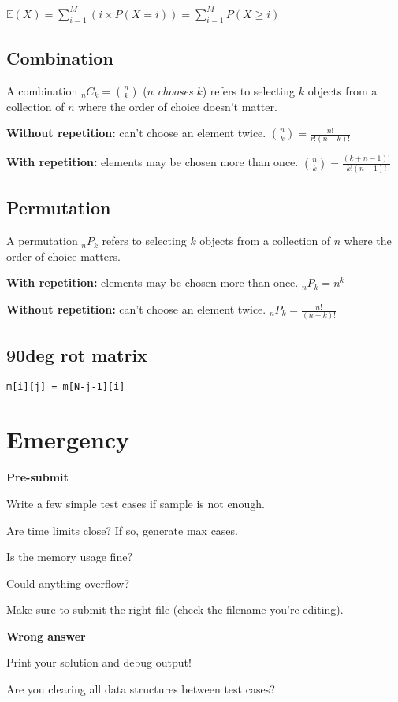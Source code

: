 \documentclass[a4paper]{article}
\begin{document}
$\mathbb{E}(X) = \sum_{i=1}^{M} (i \times P(X=i)) = \sum_{i=1}^{M} P(X \geq i)$

\subsection{Combination}
A combination ${}_nC_k = \binom{n}{k}$ ($n$ \textit{chooses} $k$) refers to selecting $k$ objects from a collection of $n$ where the order of choice doesn't matter.

\textbf{Without repetition:} can't choose an element twice. $\binom{n}{k} = \frac{n!}{r!(n-k)!}$

\textbf{With repetition:} elements may be chosen more than once. $\binom{n}{k} = \frac{(k+n-1)!}{k!(n-1)!}$

\subsection{Permutation}
A permutation ${}_nP_k$ refers to selecting $k$ objects from a collection of $n$ where the order of choice matters.

\textbf{With repetition:} elements may be chosen more than once. ${}_nP_k = n^k$

\textbf{Without repetition:} can't choose an element twice. ${}_nP_k = \frac{n!}{(n-k)!}$

\subsection{90deg rot matrix}
\texttt{m[i][j] = m[N-j-1][i]}

\section{Emergency}
\noindent
\textbf{Pre-submit}

\noindent
Write a few simple test cases if sample is not enough.

\noindent
Are time limits close? If so, generate max cases.

\noindent
Is the memory usage fine?

\noindent
Could anything overflow?

\noindent
Make sure to submit the right file (check the filename you're editing).

\noindent
\textbf{Wrong answer}

\noindent
Print your solution and debug output!

\noindent
Are you clearing all data structures between test cases?
\end{document}
